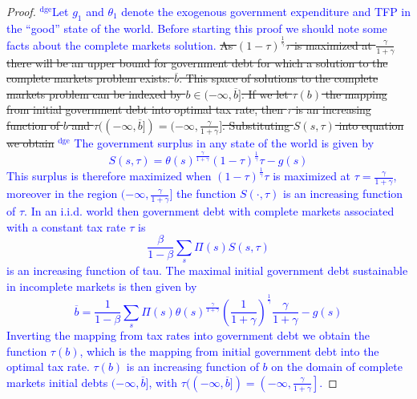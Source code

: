\documentclass[12pt]{article}
\newcommand{\dge}[1]{\textcolor{blue}{$^{\textrm{dge}}${#1}}}
\begin{document}
\begin{proof}  \dge{Let $g_1$ and $\theta_1$ denote the exogenous government expenditure and TFP in the ``good'' state of the world.  Before starting this proof we should note some facts about the complete markets solution.}\st{
As $(1-\tau)^\frac1\gamma\tau$ is maximized at $\frac\gamma{1+\gamma}$ there will be an upper bound for government debt for which a solution to the complete markets problem exists: $\overline b$.  This space of solutions to the complete markets problem can be indexed by $b\in(-\infty,\overline b]$.  If we let $\tau(b)$ the mapping from initial government debt into optimal tax rate, then $\tau$ is an increasing function of $b$ and $\tau((-\infty,\overline b]) = (-\infty,\frac{\gamma}{1+\gamma}]$.    Substituting $S(s,\tau)$ into equation we obtain}
\dge{  The government surplus in any state of the world is given by 
\[
	S(s,\tau) = \theta(s)^\frac\gamma{1+\gamma}(1-\tau)^\frac1\gamma\tau - g(s)
\]  This surplus is therefore maximized when $(1-\tau)^\frac1\gamma\tau$ is maximized at $\tau = \frac\gamma{1+\gamma}$, moreover in the region $(-\infty,\frac\gamma{1+\gamma}]$ the function $S(\cdot,\tau)$ is an increasing function of $\tau$.  In an i.i.d. world then government debt with complete markets associated with a constant tax rate $\tau$ is 
\[
	\frac\beta{1-\beta} \sum_s \Pi(s) S(s,\tau)
\] is an increasing function of tau.  The maximal initial government debt sustainable in incomplete markets is then given by
\[
	\overline b = \frac1{1-\beta} \sum_s \Pi(s)\theta(s)^\frac\gamma{1+\gamma}\left(\frac{1}{1+\gamma}\right)^\frac1\gamma\frac{\gamma}{1+\gamma} - g(s)
\]Inverting the mapping from tax rates into government debt we obtain the function $\tau(b)$, which is the mapping from initial government debt into the optimal tax rate.  $\tau(b)$ is an increasing function of $b$ on the domain of complete markets initial debts $(-\infty,\overline b]$, with $\tau((-\infty,\overline{b}]) = \left(-\infty,\frac\gamma{1+\gamma}\right]$.}



\end{proof}
\end{document}
